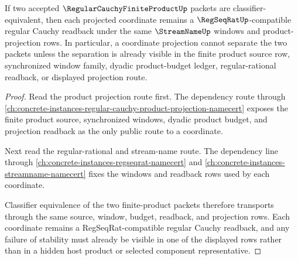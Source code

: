 \begin{theorem}
\label{thm:regular-cauchy-finite-product-coordinate-stability}
If two accepted $\RegularCauchyFiniteProductUp$ packets are classifier-equivalent, then each projected coordinate remains a $\RegSeqRatUp$-compatible regular Cauchy readback under the same $\StreamNameUp$ windows and product-projection rows. In particular, a coordinate projection cannot separate the two packets unless the separation is already visible in the finite product source row, synchronized window family, dyadic product-budget ledger, regular-rational readback, or displayed projection route.
\end{theorem}
\begin{proof}
Read the product projection route first. The dependency route through \autoref{ch:concrete-instances-regular-cauchy-product-projection-namecert} exposes the finite product source, synchronized windows, dyadic product budget, and projection readback as the only public route to a coordinate.

Next read the regular-rational and stream-name route. The dependency line through \autoref{ch:concrete-instances-regseqrat-namecert} and \autoref{ch:concrete-instances-streamname-namecert} fixes the windows and readback rows used by each coordinate.

Classifier equivalence of the two finite-product packets therefore transports through the same source, window, budget, readback, and projection rows. Each coordinate remains a RegSeqRat-compatible regular Cauchy readback, and any failure of stability must already be visible in one of the displayed rows rather than in a hidden host product or selected component representative.
\end{proof}

